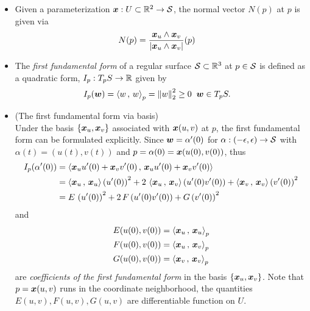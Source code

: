 \documentclass[11pt]{article}
\begin{document}
\begin{itemize}
 \item Given a parameterization $\boldsymbol{x}: U\subset {\mathbb R}^{2} \rightarrow {\mathcal S}$, the normal vector $N(p)$ at $p$ is given via
\begin{align}
N(p) &= \frac{\boldsymbol{x}_{u} \wedge \boldsymbol{x}_{v}}{\left\lvert \boldsymbol{x}_{u} \wedge \boldsymbol{x}_{v} \right\rvert}(p) \label{eqn: normal_vec_field_1}
\end{align}

\item The \emph{first fundamental form} of a regular surface ${\mathcal S}\subset {\mathbb R}^{3}$ at $p\in {\mathcal S}$ is defined as a  quadratic form,  $I_{p}: T_{p}S \rightarrow {\mathbb R}$ given by 
\begin{align}
I_{p}(\boldsymbol{w}) &= \left\langle w\,,\, w \right\rangle_{p} = \left\|w\right\|_{2}^{2} \ge 0\; \; \boldsymbol{w}\in T_{p}S. \label{eqn: first_fund_form1}
\end{align}

\item (The first fundamental form via basis)\\
Under the basis $\left\{\boldsymbol{x}_{u}, \boldsymbol{x}_{v}\right\}$ associated with $\boldsymbol{x}(u,v)$ at $p$, the first fundamental form can be formulated explicitly. Since $\boldsymbol{w} = \alpha'(0)$ for $\alpha:  (-\epsilon, \epsilon) \rightarrow {\mathcal S}$ with $\alpha(t) = (u(t), v(t))$ and $p = \alpha(0) = \boldsymbol{x}(u(0), v(0))$, thus
\begin{align}
I_{p}(\alpha'(0)) &= \left\langle \boldsymbol{x}_{u}u'(0) + \boldsymbol{x}_{v}v'(0)\,,\, \boldsymbol{x}_{u}u'(0) + \boldsymbol{x}_{v}v'(0) \right\rangle \nonumber\\
&= \left\langle \boldsymbol{x}_{u}\,,\, \boldsymbol{x}_{u} \right\rangle\left(u'(0)\right)^{2} + 2\,\left\langle \boldsymbol{x}_{u}\,,\, \boldsymbol{x}_{v} \right\rangle\left(u'(0)v'(0)\right) +  \left\langle \boldsymbol{x}_{v}\,,\, \boldsymbol{x}_{v} \right\rangle\left(v'(0)\right)^{2}\nonumber\\
&= E\,\left(u'(0)\right)^{2} + 2\,F\left(u'(0)v'(0)\right) + G\left(v'(0)\right)^{2} \label{eqn: first_fund_form2}
\end{align}
and 
\begin{align}
E(u(0), v(0)) &= \left\langle \boldsymbol{x}_{u}\,,\, \boldsymbol{x}_{u} \right\rangle_{p}\nonumber\\
F(u(0), v(0)) &= \left\langle \boldsymbol{x}_{u}\,,\, \boldsymbol{x}_{v} \right\rangle_{p}\nonumber\\
G(u(0), v(0)) &= \left\langle \boldsymbol{x}_{v}\,,\, \boldsymbol{x}_{v} \right\rangle_{p} \label{eqn: first_fund_coeff}
\end{align} are \emph{coefficients of the first fundamental form} in the basis $\left\{\boldsymbol{x}_{u}, \boldsymbol{x}_{v}\right\}$. Note that $p=\boldsymbol{x}(u,v)$ runs in the coordinate neighborhood, the quantities $E(u,v), F(u,v), G(u,v)$ are differentiable function on $U$.


\end{itemize}
\end{document}
